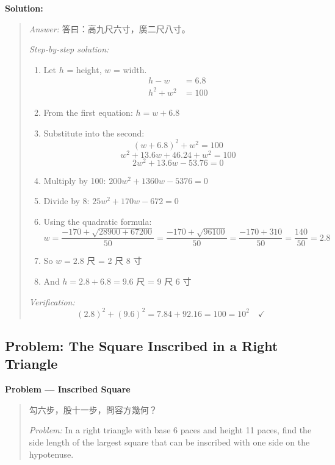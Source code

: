\documentclass[11pt,a4paper]{article}
\newcommand{\zh}[1]{{#1}}
\newenvironment{chproblem}[1][]{%
  \par\medskip\noindent\textbf{\textcolor{sectioncolor}{#1}}\par\nopagebreak
  \begin{quote}\small
}{%
  \end{quote}\medskip
}
\newenvironment{chsolution}{%
  \par\medskip\noindent\textbf{\textcolor{notecolor}{Solution:}}\par\nopagebreak
  \begin{quote}\small
}{%
  \end{quote}\medskip
}
\newenvironment{stepbystep}{%
  \par\smallskip\noindent\textit{Step-by-step solution:}\par\nopagebreak
  \begin{enumerate}[leftmargin=2em,label=\textbf{Step \arabic*:},ref=\arabic*]
}{%
  \end{enumerate}\medskip
}
\begin{document}
\begin{chsolution}
\textit{Answer:} \zh{答曰：高九尺六寸，廣二尺八寸。}

\begin{stepbystep}
\item Let $h$ = height, $w$ = width.
\begin{align*}
h - w &= 6.8 \\
h^2 + w^2 &= 100
\end{align*}

\item From the first equation: $h = w + 6.8$

\item Substitute into the second:
\[
(w + 6.8)^2 + w^2 = 100
\]
\[
w^2 + 13.6w + 46.24 + w^2 = 100
\]
\[
2w^2 + 13.6w - 53.76 = 0
\]

\item Multiply by 100: $200w^2 + 1360w - 5376 = 0$

\item Divide by 8: $25w^2 + 170w - 672 = 0$

\item Using the quadratic formula:
\[
w = \frac{-170 + \sqrt{28900 + 67200}}{50} = \frac{-170 + \sqrt{96100}}{50} = \frac{-170 + 310}{50} = \frac{140}{50} = 2.8
\]

\item So $w = 2.8$ \zh{尺} = 2 \zh{尺} 8 \zh{寸}

\item And $h = 2.8 + 6.8 = 9.6$ \zh{尺} = 9 \zh{尺} 6 \zh{寸}
\end{stepbystep}

\textit{Verification:}
\[
(2.8)^2 + (9.6)^2 = 7.84 + 92.16 = 100 = 10^2 \quad \checkmark
\]
\end{chsolution}

\subsection{Problem: The Square Inscribed in a Right Triangle}

\begin{chproblem}[Problem --- Inscribed Square]
\zh{勾六步，股十一步，問容方幾何？}

\medskip
\textit{Problem:} In a right triangle with base 6 paces and height 11 paces,
find the side length of the largest square that can be inscribed with one
side on the hypotenuse.
\end{chproblem}
\end{document}
